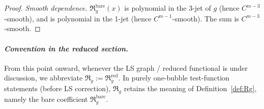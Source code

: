 \documentclass[11pt,reqno,a4paper]{amsart}
\numberwithin{equation}{section}
\theoremstyle{plain}
\theoremstyle{remark}
\theoremstyle{plain}
\begin{document}
\begin{proof}
\noindent\emph{Smooth dependence.}
$\mathfrak R_g^{\mathrm{bare}}(x)$ is polynomial in the 3-jet of $g$
(hence $C^{m-3}$-smooth), and
 is polynomial in the 1-jet
(hence $C^{m-1}$-smooth). The sum is $C^{m-3}$-smooth.
\end{proof}

\paragraph{\emph{Convention in the reduced section.}}
From this point onward, whenever the LS graph / reduced functional is under discussion,
we abbreviate $\mathfrak R_g:=\mathfrak R_g^{\mathrm{red}}$.
In purely one-bubble test-function statements (before LS correction),
$\mathfrak R_g$ retains the meaning of Definition~\ref{def:Rg},
namely the bare coefficient $\mathfrak R_g^{\mathrm{bare}}$.
\end{document}
